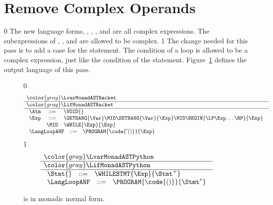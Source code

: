 \documentclass[7x10]{TimesAPriori_MIT}%
\newcommand{\gray}[1]{{\color{gray} #1}}
\def\racketEd{0}
\def\pythonEd{1}
\def\edition{1}
\newcommand{\pythonColor}[0]{}
\numberwithin{theorem}{chapter}
\numberwithin{definition}{chapter}
\numberwithin{equation}{chapter}
\begin{document}
\section{Remove Complex Operands}
\label{sec:rco-loop}

{\if\edition\racketEd
%
The new language forms, , , , and
 are all complex expressions. The subexpressions of
, , and  are allowed to be complex.
%
\fi}
{\if\edition\pythonEd\pythonColor
%
The change needed for this pass is to add a case for the 
statement. The condition of a loop is allowed to be a complex
expression, just like the condition of the  statement.
%
\fi}  
%
Figure~\ref{fig:Lwhile-anf-syntax} defines the output language
\LangLoopANF{} of this pass.

\newcommand{\LwhileMonadASTRacket}{
\begin{array}{rcl}
\Atm &::=& \VOID{} \\
\Exp &::=& \GETBANG{\Var}
      \MID \SETBANG{\Var}{\Exp} 
      \MID \BEGIN{\LP\Exp\ldots\RP}{\Exp} \\
      &\MID& \WHILE{\Exp}{\Exp}
\end{array}
}

\newcommand{\LwhileMonadASTPython}{
\begin{array}{rcl}
\Stmt{} &::=& \WHILESTMT{\Exp}{\Stmt^{+}} 
\end{array}
}

\begin{figure}[tp]
  \centering
\begin{tcolorbox}[colback=white]  
\small
{\if\edition\racketEd    
\[
\begin{array}{l}
  \gray{\LvarMonadASTRacket} \\ \hline
  \gray{\LifMonadASTRacket} \\ \hline
  \LwhileMonadASTRacket \\ 
\begin{array}{rcl}
\LangLoopANF  &::=& \PROGRAM{\code{'()}}{\Exp}
\end{array}
\end{array}
\]
\fi}
{\if\edition\pythonEd\pythonColor
\[
\begin{array}{l}
  \gray{\LvarMonadASTPython} \\ \hline
  \gray{\LifMonadASTPython} \\ \hline
  \LwhileMonadASTPython \\
   \begin{array}{rcl}
     \LangLoopANF  &::=& \PROGRAM{\code{()}}{\Stmt^{*}}
   \end{array}
\end{array}
\]
\fi}
\end{tcolorbox}

\caption{\LangLoopANF{} is \LangLoop{} in monadic normal form.}
\label{fig:Lwhile-anf-syntax}
\end{figure}
\end{document}
